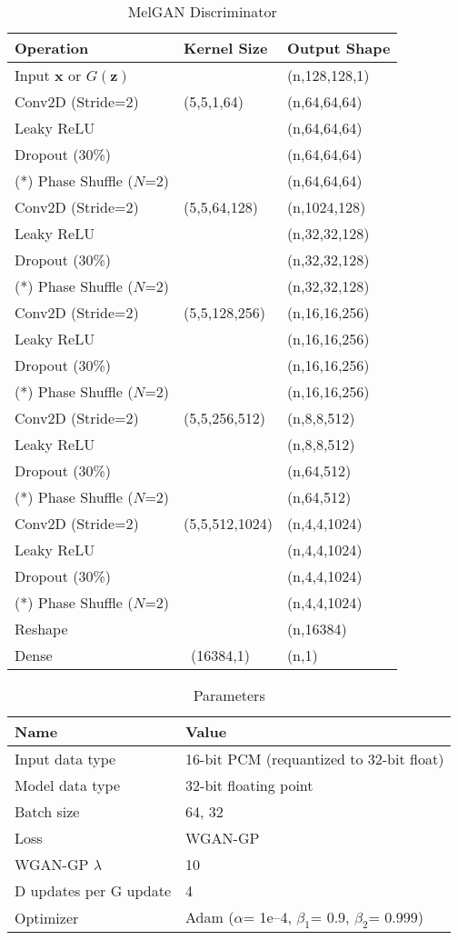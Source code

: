 \begin{table}[h]
\caption{MelGAN Discriminator}\label{melgan_disc}
\centering
\begin{tabular}{l|l|l}
Operation & Kernel Size & Output Shape \\ \hline
Input $\boldsymbol{x}$ or $G(\boldsymbol z)$ & \  & (n,128,128,1)\\
Conv2D (Stride=2) & (5,5,1,64) & (n,64,64,64)\\
Leaky ReLU & \ & (n,64,64,64) \\
Dropout (30\%) & \ & (n,64,64,64)\\
(*) Phase Shuffle ($N$=2) & \ & (n,64,64,64)\\
Conv2D (Stride=2) & (5,5,64,128) & (n,1024,128)\\
Leaky ReLU & \ & (n,32,32,128) \\
Dropout (30\%) & \ & (n,32,32,128)\\
(*) Phase Shuffle ($N$=2) & \ & (n,32,32,128)\\
Conv2D (Stride=2) & (5,5,128,256) & (n,16,16,256)\\
Leaky ReLU & \ & (n,16,16,256) \\
Dropout (30\%) & \ & (n,16,16,256)\\
(*) Phase Shuffle ($N$=2) & \ & (n,16,16,256)\\
Conv2D (Stride=2) & (5,5,256,512) & (n,8,8,512)\\
Leaky ReLU & \ & (n,8,8,512) \\
Dropout (30\%) & \ & (n,64,512)\\
(*) Phase Shuffle ($N$=2) & \ & (n,64,512)\\
Conv2D (Stride=2) & (5,5,512,1024) & (n,4,4,1024)\\
Leaky ReLU & \ & (n,4,4,1024) \\
Dropout (30\%) & \ & (n,4,4,1024)\\
(*) Phase Shuffle ($N$=2) & \ & (n,4,4,1024)\\
Reshape &\ & (n,16384)\\
Dense &\ (16384,1) & (n,1)
\end{tabular}
\end{table}

\begin{table}[h]
\caption{Parameters}\label{param_table}
\centering
\begin{tabular}{l|l}
Name & Value \\ \hline
Input data type & 16-bit PCM (requantized to 32-bit float)\\
Model data type & 32-bit floating point\\
Batch size & 64, 32\\
Loss & WGAN-GP \cite{gulrajani2017improved}\\
WGAN-GP $\lambda$ & 10\\
D updates per G update & 4\\
Optimizer & Adam ($\alpha$= 1e--4, $\beta_1$= 0.9, $\beta_2$= 0.999)
\end{tabular}
\end{table}